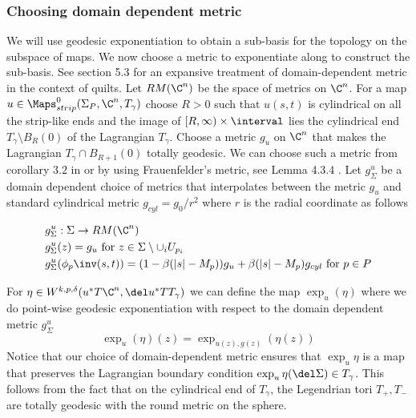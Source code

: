 \subsubsection{Choosing domain dependent metric}
We will use geodesic exponentiation to obtain a sub-basis for the topology on the subspace of maps. We now choose a metric to exponentiate along to construct the sub-basis. See section 5.3 \cite{Mauthesis} for an expansive treatment of domain-dependent metric in the context of quilts. Let $RM(\C^n)$ be the space of metrics on $\C^n$. For a map $u \in \Maps^0_{strip}(\Sigma_P, \C^n , T_\gamma)$  choose $R>0$ such that $u(s,t)$ is cylindrical on all the strip-like ends and the image of $[R,\infty) \times \interval$ lies the cylindrical end $T_\gamma \setminus B_R(0)$ of the Lagrangian $T_\gamma$. Choose a metric $g_u$ on $\C^n$ that makes the Lagrangian $T_\gamma \cap B_{R+1}(0)$ totally geodesic. We can choose such a metric from corollary $3.2$ in \cite{abouzaidExotic} or by using Frauenfelder's metric, see Lemma 4.3.4 \cite{jholobook}. Let $g^u_\Sigma$ be a domain dependent choice of metrics that interpolates between the metric $g_u$   and standard cylindrical metric $g_{cyl} = g_0/r^2$ where $r$ is the radial coordinate as follows 

\begin{align*}
    &g^u_\Sigma : \Sigma \to RM(\C^n) \\
    &g^u_\Sigma(z) = g_u \text{ for  } z \in \Sigma \setminus \cup_i U_{p_i} \\
    &g^u_\Sigma(\phi_p \inv (s,t)) = (1-\beta(|s| -M_p))g_u +  \beta(|s| -M_p)g_{cyl} \text{ for  } p \in P
\end{align*}


\noindent For $\eta \in W^{k,p,\delta} (u^*T\C^n,\del  u^* TT_\gamma)$  we can define the map   $\exp _u (\eta)$ where we do point-wise geodesic exponentiation with respect to the domain dependent metric $g^u_\Sigma$  $$\exp _u (\eta) (z) = \exp_{u(z),g(z)}(\eta (z))$$
\noindent Notice that our choice of domain-dependent metric ensures that $\exp_u \eta $ is a map that preserves the Lagrangian boundary condition $ \exp_u \eta (\del \Sigma) \in T_\gamma$. This follows from the fact that on the cylindrical end of $T_\gamma$, the Legendrian tori $T_+,T_-$ are totally geodesic with the round metric on the sphere.
















